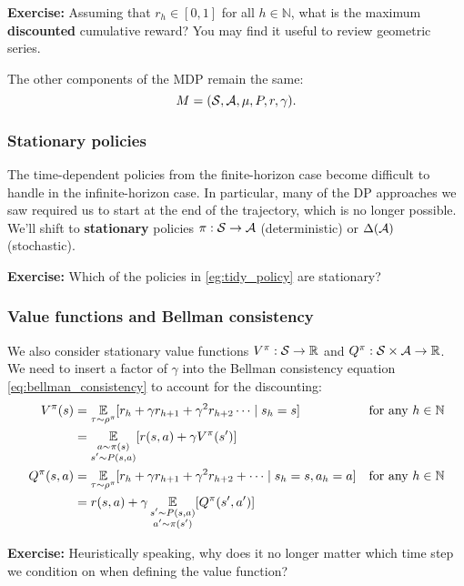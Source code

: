 \documentclass[\main/main]{subfiles}
\begin{document}
\textbf{Exercise:} Assuming that $r_h \in [0, 1]$ for all $h \in \mathbb{N}$, what is the maximum \textbf{discounted} cumulative reward? You may find it useful to review geometric series.

The other components of the MDP remain the same:
\[ M = (\mathcal{S}, \mathcal{A}, \mu, P, r, \gamma). \]

\subsubsection{Stationary policies}

The time-dependent policies from the finite-horizon case become difficult to handle in the infinite-horizon case. In particular, many of the DP approaches we saw required us to start at the end of the trajectory, which is no longer possible. We'll shift to \textbf{stationary} policies $\pi : \mathcal{S} \to \mathcal{A}$ (deterministic) or $\Delta(\mathcal{A})$ (stochastic).

\textbf{Exercise:} Which of the policies in \ref{eg:tidy_policy} are stationary?

\subsubsection{Value functions and Bellman consistency}

We also consider stationary value functions $V^\pi : \mathcal{S} \to \mathbb{R}$ and $Q^\pi : \mathcal{S} \times \mathcal{A} \to \mathbb{R}$. We need to insert a factor of $\gamma$ into the Bellman consistency equation \eqref{eq:bellman_consistency} to account for the discounting:
\begin{equation}
\begin{aligned}
    V^\pi(s) &= \operatorname*{\mathbb{E}}_{\tau \sim \rho^\pi} [r_h + \gamma r_{h+1} + \gamma^2 r_{h+2} \cdots \mid s_h = s] && \text{for any } h \in \mathbb{N} \\
    &= \operatorname*{\mathbb{E}}_{\substack{a \sim \pi(s) \\ s' \sim P(s, a)}} [r(s, a) + \gamma V^\pi(s')]\\
    Q^\pi(s, a) &= \operatorname*{\mathbb{E}}_{\tau \sim \rho^\pi} [r_h + \gamma r_{h+1} + \gamma^2 r_{h+2} + \cdots \mid s_h = s, a_h = a] && \text{for any } h \in \mathbb{N} \\
    &= r(s, a) + \gamma \operatorname*{\mathbb{E}}_{\substack{s' \sim P(s, a) \\ a' \sim \pi(s')}} [Q^\pi(s', a')]
\end{aligned}
\label{eq:bellman_consistency_infinite}
\end{equation}

\textbf{Exercise:} Heuristically speaking, why does it no longer matter which time step we condition on when defining the value function?
\end{document}
